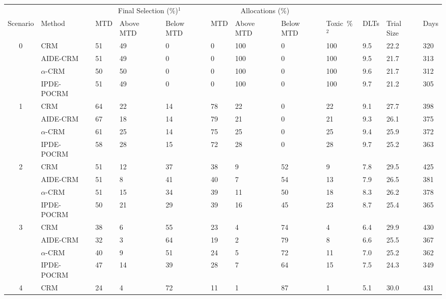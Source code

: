 \begin{tabular*}{\textwidth}{@{\extracolsep\fill}clllllllllll@{\extracolsep\fill}}
\toprule
&  & \multicolumn{3}{c}{Final Selection (\%)$^1$} & \multicolumn{3}{c}{Allocations (\%)} & &  &  &  \\
\multirow{2}{2em}{Scenario} & \multirow{2}{2em}{Method} & \multirow{2}{2em}{MTD} & \multirow{2}{2em}{Above MTD} & \multirow{2}{2em}{Below MTD} & \multirow{2}{2em}{MTD} & \multirow{2}{2em}{Above MTD} & \multirow{2}{2em}{Below MTD} & \multirow{2}{2em}{Toxic~\%$^2$} & \multirow{2}{2em}{DLTs} & \multirow{2}{2em}{Trial Size} & \multirow{2}{2em}{Days}  \\ \\ 
\midrule
\multirow{4}{2em}{0} & CRM & 51 & 49 & 0 & 0 & 100 & 0 & 100 & 9.5 & 22.2 & 320\\
 & AIDE-CRM & 51 & 49 & 0 & 0 & 100 & 0 & 100 & 9.5 & 21.7 & 313\\
 & $\alpha$-CRM & 50 & 50 & 0 & 0 & 100 & 0 & 100 & 9.6 & 21.7 & 312\\
 & IPDE-POCRM & 51 & 49 & 0 & 0 & 100 & 0 & 100 & 9.7 & 21.2 & 305\\
\midrule
\multirow{4}{2em}{1} & CRM & 64 & 22 & 14 & 78 & 22 & 0 & 22 & 9.1 & 27.7 & 398\\
 & AIDE-CRM & 67 & 18 & 14 & 79 & 21 & 0 & 21 & 9.3 & 26.1 & 375\\
 & $\alpha$-CRM & 61 & 25 & 14 & 75 & 25 & 0 & 25 & 9.4 & 25.9 & 372\\
 & IPDE-POCRM & 58 & 28 & 15 & 72 & 28 & 0 & 28 & 9.7 & 25.2 & 363\\
\midrule
\multirow{4}{2em}{2} & CRM & 51 & 12 & 37 & 38 & 9 & 52 & 9 & 7.8 & 29.5 & 425\\
 & AIDE-CRM & 51 & 8 & 41 & 40 & 7 & 54 & 13 & 7.9 & 26.5 & 381\\
 & $\alpha$-CRM & 51 & 15 & 34 & 39 & 11 & 50 & 18 & 8.3 & 26.2 & 378\\
 & IPDE-POCRM & 50 & 21 & 29 & 39 & 16 & 45 & 23 & 8.7 & 25.4 & 365\\
\midrule
\multirow{4}{2em}{3} & CRM & 38 & 6 & 55 & 23 & 4 & 74 & 4 & 6.4 & 29.9 & 430\\
 & AIDE-CRM & 32 & 3 & 64 & 19 & 2 & 79 & 8 & 6.6 & 25.5 & 367\\
 & $\alpha$-CRM & 40 & 9 & 51 & 24 & 5 & 72 & 11 & 7.0 & 25.2 & 362\\
 & IPDE-POCRM & 47 & 14 & 39 & 28 & 7 & 64 & 15 & 7.5 & 24.3 & 349\\
\midrule
\multirow{4}{2em}{4} & CRM & 24 & 4 & 72 & 11 & 1 & 87 & 1 & 5.1 & 30.0 & 431\\

\end{tabular*}
